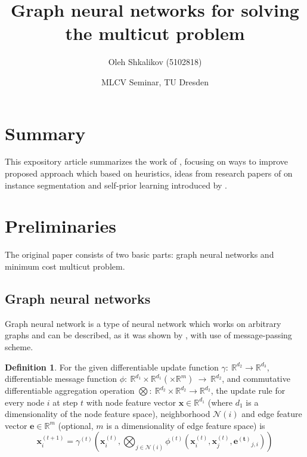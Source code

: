 \documentclass[10pt, twocolumn, a4paper]{article}
\theoremstyle{definition}
\newtheorem{definition}{Definition}
\begin{document}
\author{Oleh Shkalikov (5102818)}
\title{\bf\Large Graph neural networks for solving the multicut problem}
\date{MLCV Seminar, TU Dresden}

\twocolumn[
    \begin{@twocolumnfalse}
        \maketitle

        \vspace{7ex}
    \end{@twocolumnfalse}
]

\section{Summary}

This expository article summarizes the work of \citet{jung2022learning}, focusing on
ways to improve proposed approach which based on heuristics, ideas from
research papers of \citet{chen2019instance} on instance segmentation and self-prior
learning introduced by \citet{Hanocka2020p2m}.

\section{Preliminaries}

The original paper consists of two basic parts: graph neural networks and
minimum cost multicut problem.

\subsection{Graph neural networks}
Graph neural network is a type of neural network which works on arbitrary graphs and can be
described, as it was shown by \citet{gilmer2017neural}, with use of message-passing scheme.

\begin{definition}
    For the given differentiable update function $\gamma:~\mathbb{R}^{d_2} \to \mathbb{R}^{d_3}$,
    differentiable message function $\phi:~\mathbb{R}^{d_1} \times \mathbb{R}^{d_1} (\times \mathbb{R}^{m})~\to~\mathbb{R}^{d_2}$, and
    commutative differentiable aggregation operation $\bigotimes:~\mathbb{R}^{d_2} \times \mathbb{R}^{d_2} \to \mathbb{R}^{d_2}$, the update rule for every
    node $i$ at step $t$ with node feature vector $\mathbf{x} \in \mathbb{R}^{d_1}$ (where $d_{1}$ is a dimensionality
    of the node feature space), neighborhood $\mathcal{N}(i)$ and
    edge feature vector $\mathbf{e} \in \mathbb{R}^m$ (optional, $m$ is a dimensionality of edge feature space) is
    \[
        \mathbf{x}_i^{(t+1)} = \gamma^{(t)} \left(\mathbf{x}_i^{(t)},
        \bigotimes_{j \in \mathcal{N}(i)} \phi^{(t)} \left(\mathbf{x}^{(t)}_i,
        \mathbf{x}^{(t)}_j, \mathbf{e^{(t)}}_{j, i} \right) \right)
    \]
\end{definition}
\end{document}

